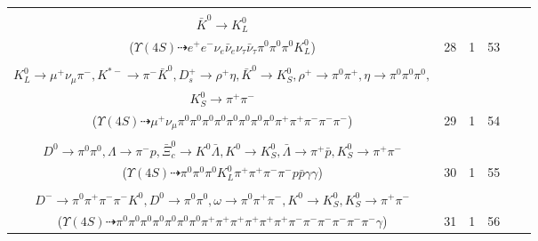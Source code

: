 \documentclass[landscape]{article}
\newcounter{rownumbers}
\newcommand\rn{\stepcounter{rownumbers}\arabic{rownumbers}}
\newcommand{\EOLP}{\\ \hline} %
\newcommand{\topoTags}[1]{#1} %
\begin{document}
\begin{longtable}{clcccc}
\rn & \makecell[l]{ $ 
\Upsilon(4S) \rightarrow B^{0} \bar{B}^{0} ,
B^{0} \rightarrow \pi^{0} \bar{D}^{0} ,
\bar{B}^{0} \rightarrow \tau^{-} \bar{\nu}_{\tau} D^{+} ,
\bar{D}^{0} \rightarrow \pi^{0} \pi^{0} ,
\tau^{-} \rightarrow e^{-} \bar{\nu}_{e} \nu_{\tau} ,
D^{+} \rightarrow e^{+} \nu_{e} \bar{K}^{0} ,
$ \\ $
\bar{K}^{0} \rightarrow K_{L}^{0} 
$ \\ ($
\Upsilon(4S) \dashrightarrow e^{+} e^{-} \nu_{e} \bar{\nu}_{e} \nu_{\tau} \bar{\nu}_{\tau} \pi^{0} \pi^{0} \pi^{0} K_{L}^{0} 
$) } & \topoTags{28 & }1 & 53 \EOLP

\rn & \makecell[l]{ $ 
\Upsilon(4S) \rightarrow B^{0} \bar{B}^{0} ,
B^{0} \rightarrow D^{-} D_{s0}^{*+} ,
\bar{B}^{0} \rightarrow \pi^{0} D^{0} ,
D^{-} \rightarrow K_{L}^{0} K^{*-} ,
D_{s0}^{*+} \rightarrow \pi^{0} D_{s}^{+} ,
D^{0} \rightarrow \pi^{0} \pi^{0} ,
$ \\ $
K_{L}^{0} \rightarrow \mu^{+} \nu_{\mu} \pi^{-} ,
K^{*-} \rightarrow \pi^{-} \bar{K}^{0} ,
D_{s}^{+} \rightarrow \rho^{+} \eta ,
\bar{K}^{0} \rightarrow K_{S}^{0} ,
\rho^{+} \rightarrow \pi^{0} \pi^{+} ,
\eta \rightarrow \pi^{0} \pi^{0} \pi^{0} ,
$ \\ $
K_{S}^{0} \rightarrow \pi^{+} \pi^{-} 
$ \\ ($
\Upsilon(4S) \dashrightarrow \mu^{+} \nu_{\mu} \pi^{0} \pi^{0} \pi^{0} \pi^{0} \pi^{0} \pi^{0} \pi^{0} \pi^{0} \pi^{+} \pi^{+} \pi^{-} \pi^{-} \pi^{-} 
$) } & \topoTags{29 & }1 & 54 \EOLP

\rn & \makecell[l]{ $ 
\Upsilon(4S) \rightarrow B^{0} \bar{B}^{0} ,
B^{0} \rightarrow K^{0} \Sigma^{0} \bar{\Xi}_{c}^{\prime0} ,
\bar{B}^{0} \rightarrow \pi^{0} D^{0} ,
K^{0} \rightarrow K_{L}^{0} ,
\Sigma^{0} \rightarrow \Lambda \gamma ,
\bar{\Xi}_{c}^{\prime0} \rightarrow \bar{\Xi}_{c}^{0} \gamma ,
$ \\ $
D^{0} \rightarrow \pi^{0} \pi^{0} ,
\Lambda \rightarrow \pi^{-} p ,
\bar{\Xi}_{c}^{0} \rightarrow K^{0} \bar{\Lambda} ,
K^{0} \rightarrow K_{S}^{0} ,
\bar{\Lambda} \rightarrow \pi^{+} \bar{p} ,
K_{S}^{0} \rightarrow \pi^{+} \pi^{-} 
$ \\ ($
\Upsilon(4S) \dashrightarrow \pi^{0} \pi^{0} \pi^{0} K_{L}^{0} \pi^{+} \pi^{+} \pi^{-} \pi^{-} p \bar{p} \gamma \gamma 
$) } & \topoTags{30 & }1 & 55 \EOLP

\rn & \makecell[l]{ $ 
\Upsilon(4S) \rightarrow B^{0} \bar{B}^{0} ,
B^{0} \rightarrow \pi^{+} \pi^{-} \rho^{+} \eta \eta^{\prime} D^{-} ,
\bar{B}^{0} \rightarrow \pi^{0} D^{0} ,
\rho^{+} \rightarrow \pi^{0} \pi^{+} ,
\eta \rightarrow \pi^{0} \pi^{+} \pi^{-} ,
\eta^{\prime} \rightarrow \omega \gamma ,
$ \\ $
D^{-} \rightarrow \pi^{0} \pi^{+} \pi^{-} \pi^{-} K^{0} ,
D^{0} \rightarrow \pi^{0} \pi^{0} ,
\omega \rightarrow \pi^{0} \pi^{+} \pi^{-} ,
K^{0} \rightarrow K_{S}^{0} ,
K_{S}^{0} \rightarrow \pi^{+} \pi^{-} 
$ \\ ($
\Upsilon(4S) \dashrightarrow \pi^{0} \pi^{0} \pi^{0} \pi^{0} \pi^{0} \pi^{0} \pi^{0} \pi^{+} \pi^{+} \pi^{+} \pi^{+} \pi^{+} \pi^{+} \pi^{-} \pi^{-} \pi^{-} \pi^{-} \pi^{-} \pi^{-} \gamma 
$) } & \topoTags{31 & }1 & 56 \EOLP


\end{longtable}
\end{document}
